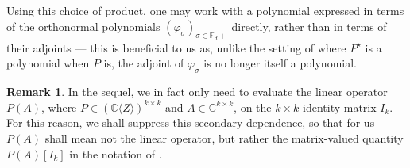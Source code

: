 \documentclass[11pt,reqno]{amsart}
\def\p{\varphi}
\def\s{\sigma}
\def\CC{\mathbb{C}}
\def\FF{\mathbb{F}}
\theoremstyle{definition}
\newtheorem{remark}[theorem]{Remark}
\numberwithin{equation}{section}
\begin{document}
Using this choice of product, one may work with a polynomial expressed in terms of the orthonormal polynomials \((\p_\s)_{\s\in\FF_d+}\) directly, rather than in terms of their adjoints --- this is beneficial to us as, unlike the setting of \cite{BMV23} where \(P^{\star}\) is a polynomial when \(P\) is, the adjoint of \(\p_\s\) is no longer itself a polynomial.

\begin{remark}
    In the sequel, we in fact only need to evaluate the linear operator \(P(A)\), where \(P \in (\CC\langle Z \rangle)^{k\times k}\) and \(A \in \CC^{k\times k}\), on the \(k\times k\) identity matrix \(I_k\). For this reason, we shall suppress this secondary dependence, so that for us \(P(A)\) shall mean not the linear operator, but rather the matrix-valued quantity \(P(A)[I_k]\) in the notation of \cite{BMV23}.
\end{remark}
\end{document}
